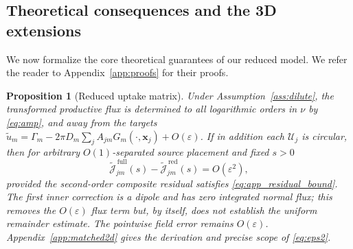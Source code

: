 \documentclass[pdflatex,sn-mathphys-num]{sn-jnl}
\numberwithin{equation}{section}
\theoremstyle{thmstyleone}%
\newtheorem{proposition}[theorem]{Proposition}
\theoremstyle{definition}
\theoremstyle{remark}
\begin{document}

\subsection{Theoretical consequences and the 3D extensions}
\label{subsec:props}
We now formalize the core theoretical guarantees of our reduced model. We refer the reader to Appendix~\ref{app:proofs} for their proofs.

\begin{proposition}[Reduced uptake matrix]\label{prop:red}
Under Assumption~\ref{ass:dilute}, the transformed productive flux is determined to all logarithmic orders in $\nu$ by \eqref{eq:amp}, and away from the targets $\widetilde u_m=\Gamma_m-2\pi D_m\sum_jA_{jm}G_m(\cdot,\mathbf x_j)+O(\varepsilon)$. If in addition each $\mathcal U_j$ is circular, then for arbitrary $O(1)$-separated source placement and fixed $s>0$
\begin{equation}
\widetilde{\mathcal J}^{\,\mathrm{full}}_{jm}(s)
-\widetilde{\mathcal J}^{\,\mathrm{red}}_{jm}(s)=O(\varepsilon^2),
\label{eq:eps2}
\end{equation}
provided the second-order composite residual satisfies
\eqref{eq:app_residual_bound}. The first inner correction is a dipole and has
zero integrated normal flux; this removes the $O(\varepsilon)$ flux term but,
by itself, does not establish the uniform remainder estimate. The pointwise
field error remains $O(\varepsilon)$. Appendix~\ref{app:matched2d} gives the
derivation and precise scope of \eqref{eq:eps2}.
\end{proposition}
\end{document}
